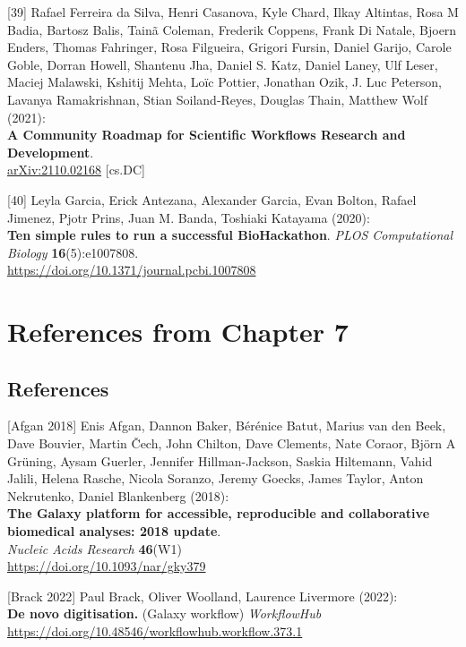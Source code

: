 {[}39{]} Rafael Ferreira da Silva, Henri Casanova, Kyle Chard, Ilkay
Altintas, Rosa M Badia, Bartosz Balis, Tainã Coleman, Frederik Coppens,
Frank Di Natale, Bjoern Enders, Thomas Fahringer, Rosa Filgueira,
Grigori Fursin, Daniel Garijo, Carole Goble, Dorran Howell, Shantenu
Jha, Daniel S. Katz, Daniel Laney, Ulf Leser, Maciej Malawski, Kshitij
Mehta, Loïc Pottier, Jonathan Ozik, J. Luc Peterson, Lavanya
Ramakrishnan, Stian Soiland-Reyes, Douglas Thain, Matthew Wolf (2021):\\
\textbf{A Community Roadmap for Scientific Workflows Research and
Development}.\\
\href{https://arxiv.org/abs/2110.02168}{arXiv:2110.02168} {[}cs.DC{]}

{[}40{]} Leyla Garcia, Erick Antezana, Alexander Garcia, Evan Bolton,
Rafael Jimenez, Pjotr Prins, Juan M. Banda, Toshiaki Katayama (2020):\\
\textbf{Ten simple rules to run a successful BioHackathon}. \emph{PLOS
Computational Biology} \textbf{16}(5):e1007808.\\
\url{https://doi.org/10.1371/journal.pcbi.1007808}



\section{References from Chapter 7}


\hypertarget{references-4}{%
\subsection{References}\label{references-4}}

{[}Afgan 2018{]} Enis Afgan, Dannon Baker, Bérénice Batut, Marius van
den Beek, Dave Bouvier, Martin Čech, John Chilton, Dave Clements, Nate
Coraor, Björn A Grüning, Aysam Guerler, Jennifer Hillman-Jackson, Saskia
Hiltemann, Vahid Jalili, Helena Rasche, Nicola Soranzo, Jeremy Goecks,
James Taylor, Anton Nekrutenko, Daniel Blankenberg (2018):\\
\textbf{The Galaxy platform for accessible, reproducible and
collaborative biomedical analyses: 2018 update}.\\
\emph{Nucleic Acids Research} \textbf{46}(W1)\\
\url{https://doi.org/10.1093/nar/gky379}

{[}Brack 2022{]} Paul Brack, Oliver Woolland, Laurence Livermore
(2022):\\
\textbf{De novo digitisation.} (Galaxy workflow) \emph{WorkflowHub}\\
\url{https://doi.org/10.48546/workflowhub.workflow.373.1}

